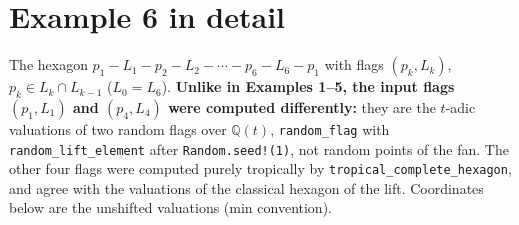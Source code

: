 \documentclass[10pt]{article}
\begin{document}
{
\par}
\newpage
\section*{Example 6 in detail}

The hexagon \(p_1 - L_1 - p_2 - L_2 - \cdots - p_6 - L_6 - p_1\) with flags \((p_k, L_k)\), \(p_k\in L_k\cap L_{k-1}\)
(\(L_0=L_6\)). \textbf{Unlike in Examples 1--5, the input flags \((p_1,L_1)\) and \((p_4,L_4)\) were computed differently:}
they are the \(t\)-adic valuations of two random flags over \(\mathbb Q(t)\),
\texttt{random\_flag} with \texttt{random\_lift\_element} after \texttt{Random.seed!(1)}, not random points of the fan.
The other four flags were computed purely tropically by \texttt{tropical\_complete\_hexagon}, and agree with the
valuations of the classical hexagon of the lift. Coordinates below are the unshifted valuations (min convention).
\end{document}

